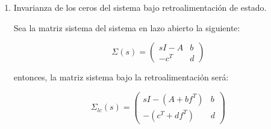 \begin{enumerate}
                \begin{equation}
                    \begin{pmatrix}
                        A_{Br} & b_{Br}
                    \end{pmatrix} =
                    \begin{amatrix}{6}
                        0 & 1 & 0 & \dots & 0 & 0 & 0 \\
                        0 & 0 & 1 & \dots & 0 & 0 & 0 \\
                        0 & 0 & 0 & \dots & 0 & 0 & 0 \\
                        \vdots & \vdots & \vdots & & \vdots & \vdots & \vdots \\
                        0 & 0 & 0 & \dots & 1 & 0 & 0 \\
                        0 & 0 & 0 & \dots & 0 & 1 & 0 \\
                        0 & 0 & 0 & \dots & 0 & 0 & 1 \\
                    \end{amatrix}
                \end{equation}

                A los indeices $k_i$ de los polinomios mínimos se les denomina indices de controlabilidad. En nuestro caso particular, existe solamente un indice de controlabilidad; $k_i = n$.

            \item Invarianza de los ceros del sistema bajo retroalimentación de estado.

            Sea la matriz sistema del sistema en lazo abierto la siguiente:

            \begin{equation*}
                \Sigma(s) =
                \begin{pmatrix}
                    sI - A & b \\
                    -c^T & d
                \end{pmatrix}
            \end{equation*}

            entonces, la matriz sistema bajo la retroalimentación será:

            \begin{equation*}
                \Sigma_{lc}(s) =
                \begin{pmatrix}
                    sI - (A + b f^T) & b \\
                    -(c^T + d f^T) & d
                \end{pmatrix}
            \end{equation*}


\end{enumerate}
